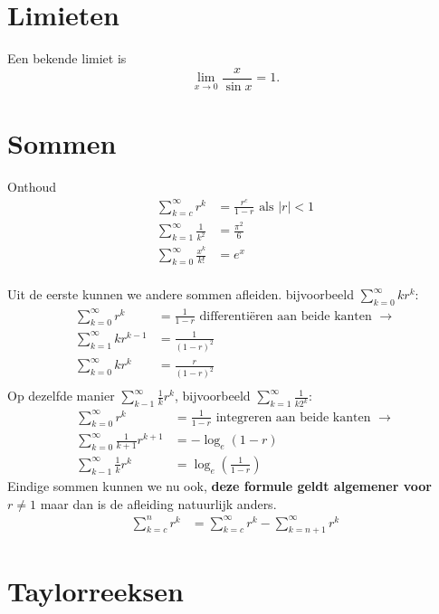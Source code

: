 \documentclass{article}
\begin{document}
    \tableofcontents
    \newpage

    \section{Limieten}\label{sec:limieten}
    Een bekende limiet is
    \[
        \lim_{x\to 0} \frac{x}{\sin x} = 1.
    \]
    \section{Sommen}\label{sec:sommen}
    Onthoud
    \begin{align*}
        \sum_{k=c}^{\infty} r^k &= \frac{r^c}{1-r} \text{ als $|r|<1$}\\
        \sum_{k=1}^{\infty} \frac{1}{k^2} &= \frac{\pi^2}{6} \\
        \sum_{k=0}^\infty \frac{x^k}{k!} &= e^x \\
    \end{align*}

    Uit de eerste kunnen we andere sommen afleiden.
    bijvoorbeeld
    $\displaystyle \sum_{k=0}^{\infty} kr^k: $
    \begin{align*}
        \sum_{k=0}^{\infty} r^k &= \frac{1}{1-r} \text { differenti\"eren aan beide kanten } \to \\
        \sum_{k=1}^{\infty} kr^{k-1} &= \frac{1}{(1-r)^2} \\
        \sum_{k=0}^{\infty} kr^k &= \frac{r}{(1-r)^2} \\
    \end{align*}
    Op dezelfde manier $\displaystyle \sum_{k-1}^\infty \frac{1}{k} r^k$, bijvoorbeeld $\displaystyle \sum_{k=1}^{\infty} \frac{1}{k2^k}$:
    \begin{align*}
        \sum_{k=0}^{\infty} r^k &= \frac{1}{1-r} \text { integreren aan beide kanten } \to \\
        \sum_{k=0}^{\infty} \frac{1}{k+1} r^{k+1} &= -\log_e (1-r) \\
        \sum_{k-1}^\infty \frac{1}{k} r^k &= \log_e (\frac{1}{1-r})
    \end{align*}
    Eindige sommen kunnen we nu ook, \textbf{deze formule geldt algemener voor $r\neq 1$} maar dan is de afleiding natuurlijk anders.
    \begin{align*}
        \sum_{k=c}^n r^k &= \sum_{k=c}^\infty r^k - \sum_{k=n+1}^\infty r^k
    \end{align*}

    \section{Taylorreeksen}\label{sec:taylorreeksen}
    
\end{document}
